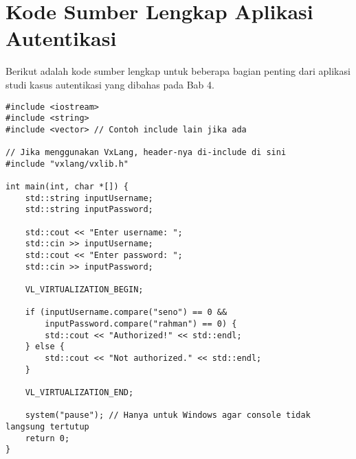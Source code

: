 \chapter*{Kode Sumber Lengkap Aplikasi Autentikasi}
\label{app:kode_sumber} 

Berikut adalah kode sumber lengkap untuk beberapa bagian penting dari aplikasi studi kasus autentikasi yang dibahas pada Bab 4.


\begin{verbatim}
#include <iostream>
#include <string>
#include <vector> // Contoh include lain jika ada

// Jika menggunakan VxLang, header-nya di-include di sini
#include "vxlang/vxlib.h"

int main(int, char *[]) {
    std::string inputUsername;
    std::string inputPassword;

    std::cout << "Enter username: ";
    std::cin >> inputUsername;
    std::cout << "Enter password: ";
    std::cin >> inputPassword;

    VL_VIRTUALIZATION_BEGIN;

    if (inputUsername.compare("seno") == 0 &&
        inputPassword.compare("rahman") == 0) {
        std::cout << "Authorized!" << std::endl;
    } else {
        std::cout << "Not authorized." << std::endl;
    }

    VL_VIRTUALIZATION_END;

    system("pause"); // Hanya untuk Windows agar console tidak langsung tertutup
    return 0;
}
    \end{verbatim}
\label{lst:console_hardcoded_full}

